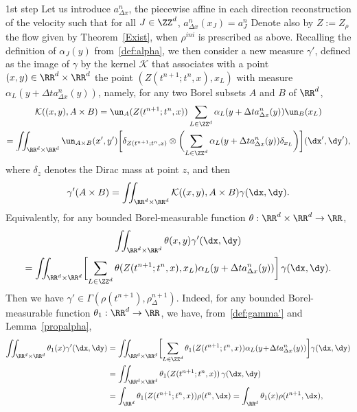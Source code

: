 \begin{step}{1st step}
Let us introduce $a^n_{\Delta x}$, the piecewise affine in each direction reconstruction of the velocity such that for all $J\in\ZZ^d$, $a^n_{\Delta x}(x_J)=a_J^n$ Denote also by $Z := Z_{\rho}$ the flow given by Theorem~\ref{Exist}, when $\rho^{ini}$ is prescribed as above. Recalling the definition of $\alpha_J(y)$ from~\eqref{def:alpha}, we then consider a new measure $\gamma'$, defined as the image of $\gamma$ by the kernel ${\mathcal K}$ that associates with a point $(x,y) \in \RR^d \times \RR^d$ the point $(Z(t^{n+1};t^n,x),x_{L})$ with measure $\alpha_{L}(y+\Delta t a^n_{\Delta x}(y))$, namely, for any two Borel subsets $A$ and $B$ of $\RR^d$,
\begin{multline*}
{\mathcal K} ((x,y), A \times B ) = \un_{A}(Z(t^{n+1};t^n,x) )
\sum_{L \in {\ZZ}^d} \alpha_{L}(y+\Delta t a^n_{\Delta x}(y) ) \un_{B}(x_{L})
\\
= \iint_{\RR^d\times \RR^d} \un_{A \times B}(x',y')
\biggl[\delta_{Z(t^{n+1};t^n,x)} \otimes \biggl(\sum_{L \in \ZZ^d}
\alpha_{L}(y+\Delta t a^n_{\Delta x}(y) )
\delta_{x_{L}}\biggr) \biggr] (\dx',\dy'),
\end{multline*}
where $\delta_{z}$ denotes the Dirac mass at point $z$, and then
\begin{equation*}
\gamma'(A \times B) = \iint_{\RR^d \times \RR^d} {\mathcal K} ((x,y),A \times B )
\gamma(\dx,\dy).
\end{equation*}
Equivalently, for any bounded Borel-measurable function $\theta : \RR^d \times \RR^d \rightarrow \RR$,
\begin{multline}\label{def:gamma'}
 \iint_{\RR^d\times\RR^d} \theta(x,y) \gamma'(\dx,\dy) \\
= \iint_{\RR^d\times\RR^d} \biggl[\sum_{L\in \ZZ^d} \theta(Z(t^{n+1};t^n,x),x_L)
\alpha_L(y+\Delta t a^n_{\Delta x}(y))\biggr]\,\gamma(\dx,\dy).
\end{multline}
Then we have $\gamma'\in\Gamma(\rho(t^{n+1}),\rho_{\Delta}^{n+1})$. Indeed, for any bounded Borel-measurable function $\theta_{1}: \RR^d \rightarrow \RR$, we have, from~\eqref{def:gamma'} and Lemma~\ref{propalpha},
\begin{align*}
\iint_{\RR^d\times\RR^d} \theta_{1}(x) \gamma'(\dx,\dy) & = \iint_{\RR^d\times\RR^d}
\biggl[\sum_{L\in \ZZ^d} \theta_{1}(Z(t^{n+1};t^n,x)) \alpha_L(y\!+\!\Delta t a^n_{\Delta x}(y))\biggr]\gamma(\dx,\dy) \\
& = \iint_{\RR^d\times\RR^d} \theta_{1}(Z(t^{n+1};t^n,x))\,\gamma(\dx,\dy) \\
& = \int_{\RR^d} \theta_{1}(Z(t^{n+1};t^n,x)) \rho(t^n,\dx) = \int_{\RR^d} \theta_{1}(x) \rho(t^{n+1},\dx),

\end{align*}
\end{step}
